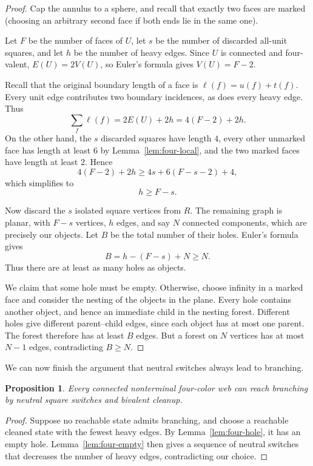 \documentclass[11pt]{article}
\newtheorem{proposition}[theorem]{Proposition}
\theoremstyle{definition}
\theoremstyle{remark}
\begin{document}
\begin{proof}
Cap the annulus to a sphere, and recall that exactly
two faces are marked (choosing an arbitrary second
face if both ends lie in the same one).

Let $F$ be the number of faces of $U$, let $s$ be
the number of discarded all-unit squares, and let
$h$ be the number of heavy edges. Since $U$ is
connected and four-valent, $E(U)=2V(U)$, so Euler's
formula gives $V(U)=F-2$.

Recall that the original boundary length of a face
is $\ell(f)=u(f)+t(f)$. Every unit edge contributes
two boundary incidences, as does every heavy edge.
Thus
\[
\sum_f\ell(f)=2E(U)+2h=4(F-2)+2h.
\]
On the other hand, the $s$ discarded squares have
length $4$, every other unmarked face has length
at least $6$ by Lemma~\ref{lem:four-local}, and
the two marked faces have length at least $2$.
Hence
\[
4(F-2)+2h\ge 4s+6(F-s-2)+4,
\]
which simplifies to
\[
h\ge F-s.
\]

Now discard the $s$ isolated square vertices
from $R$. The remaining graph is planar, with
$F-s$ vertices, $h$ edges, and say $N$ connected
components, which are precisely our objects.
Let $B$ be the total number of their holes.
Euler's formula gives
\[
B=h-(F-s)+N\ge N.
\]
Thus there are at least as many holes as objects.

We claim that some hole must be empty. Otherwise,
choose infinity in a marked face and consider the
nesting of the objects in the plane. Every hole
contains another object, and hence an immediate
child in the nesting forest. Different holes give
different parent--child edges, since each object
has at most one parent. The forest therefore has
at least $B$ edges. But a forest on $N$ vertices
has at most $N-1$ edges, contradicting $B\ge N$.
\end{proof}

We can now finish the argument that neutral switches
always lead to branching.

\begin{proposition}\label{prop:four-availability}
Every connected nonterminal four-color web can reach
branching by neutral square switches and bivalent
cleanup.
\end{proposition}

\begin{proof}
Suppose no reachable state admits branching,
and choose a reachable cleaned state with the
fewest heavy edges. By Lemma~\ref{lem:four-hole},
it has an empty hole. Lemma~\ref{lem:four-empty}
then gives a sequence of neutral switches that
decreases the number of heavy edges, contradicting
our choice.
\end{proof}
\end{document}
